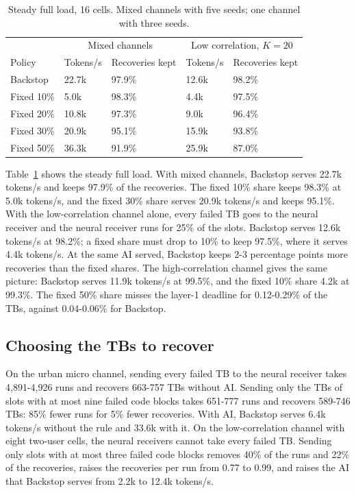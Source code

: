 \documentclass[acmsmall,screen,review,anonymous]{acmart}
\newcommand{\sys}{Backstop\xspace}
\begin{document}
\begin{table}[t]
\caption{Steady full load, 16 cells. Mixed channels with five seeds; one channel with three seeds.}
\label{tab:steady}
\footnotesize
\begin{tabular}{@{}lllll@{}}
\toprule
 & \multicolumn{2}{c}{Mixed channels} & \multicolumn{2}{c}{Low correlation, $K=20$} \\
Policy & Tokens/s & Recoveries kept & Tokens/s & Recoveries kept \\
\midrule
\sys & 22.7k & 97.9\% & 12.6k & 98.2\% \\
Fixed 10\% & 5.0k & 98.3\% & 4.4k & 97.5\% \\
Fixed 20\% & 10.8k & 97.3\% & 9.0k & 96.4\% \\
Fixed 30\% & 20.9k & 95.1\% & 15.9k & 93.8\% \\
Fixed 50\% & 36.3k & 91.9\% & 25.9k & 87.0\% \\
\bottomrule
\end{tabular}
\end{table}

Table~\ref{tab:steady} shows the steady full load. With mixed channels, \sys serves 22.7k tokens/s and
keeps 97.9\% of the recoveries. The fixed 10\% share keeps 98.3\% at 5.0k tokens/s, and the fixed 30\%
share serves 20.9k tokens/s and keeps 95.1\%. With the low-correlation channel alone, every failed TB goes
to the neural receiver and the neural receiver runs for 25\% of the slots. \sys serves 12.6k tokens/s at
98.2\%; a fixed share must drop to 10\% to keep 97.5\%, where it serves 4.4k tokens/s. At the same AI
served, \sys keeps 2-3 percentage points more recoveries than the fixed shares. The high-correlation channel
gives the same picture: \sys serves 11.9k tokens/s at 99.5\%, and the fixed 10\% share 4.2k at 99.3\%.
The fixed 50\% share misses the layer-1 deadline for 0.12-0.29\% of the TBs, against 0.04-0.06\% for \sys.

\subsection{Choosing the TBs to recover}

On the urban micro channel, sending every failed TB to the neural receiver takes 4,891-4,926 runs and
recovers 663-757 TBs without AI. Sending only the TBs of slots with at most nine failed code blocks takes
651-777 runs and recovers 589-746 TBs: 85\% fewer runs for 5\% fewer recoveries. With AI, \sys serves 6.4k
tokens/s without the rule and 33.6k with it. On the low-correlation channel with eight two-user cells, the
neural receivers cannot take every failed TB. Sending only slots with at most three failed code blocks
removes 40\% of the runs and 22\% of the recoveries, raises the recoveries per run from 0.77 to 0.99, and
raises the AI that \sys serves from 2.2k to 12.4k tokens/s.
\end{document}
